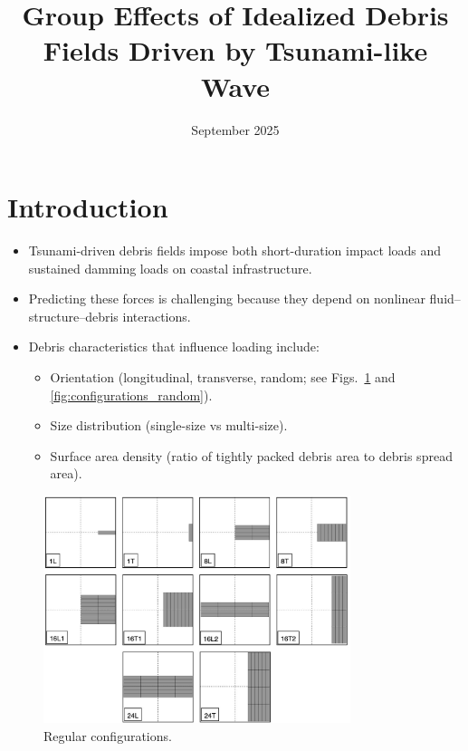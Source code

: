 \documentclass{article}
\title{Group Effects of Idealized Debris Fields Driven by Tsunami-like Wave}
\date{September 2025}
\begin{document}
\maketitle

\section{Introduction}
\begin{itemize}
    \item Tsunami-driven debris fields impose both short-duration impact loads and sustained damming loads on coastal infrastructure.
    \item Predicting these forces is challenging because they depend on  nonlinear fluid--structure--debris interactions.
    \item Debris characteristics that influence loading include:
    \begin{itemize}
        \item Orientation (longitudinal, transverse, random; see Figs.~\ref{fig:configurations} and \ref{fig:configurations_random}).
        \item Size distribution (single-size vs multi-size).
        \item Surface area density (ratio of tightly packed debris area to debris spread area).
    \end{itemize}

\end{itemize}

\begin{figure}[htbp]
    \centering
    \includegraphics[width=0.8\textwidth]{Configurations.jpg}
    \caption{Regular configurations.}
    \label{fig:configurations}
\end{figure}
\end{document}
